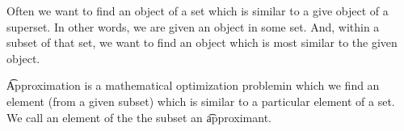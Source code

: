

Often we want to find an object of a set which is similar to a give object of a superset.
In other words, we are given an object in some set.
And, within a subset of that set, we want to find an object which is most similar to the given object.


\t{Approximation} is a mathematical optimization problemin which we find an element (from a given subset) which is similar to a particular element of a set.
We call an element of the the subset an \t{approximant}.
